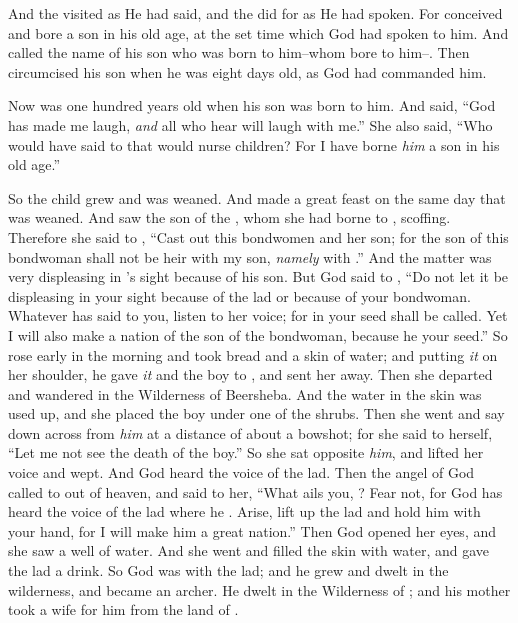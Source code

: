 
\bverse And the \lord visited \Sarah as He had said, and the \lord did for \Sarah as He had spoken.
\bverse For \Sarah conceived and bore \Abraham a son in his old age, at the set time which God had spoken to him.
\bverse And \Abraham called the name of his son who was born to him--whom \Sarah bore to him--\Isaac. 
\bverse Then \Abraham circumcised his son \Isaac when he was eight days old, as God had commanded him.

\bverse Now \Abraham was one hundred years old when his son \Isaac was born to him.
\bverse And \Sarah said, ``God has made me laugh, \textit{and} all who hear will laugh with me.''
\bverse She also said, ``Who would have said to \Abraham that \Sarah would nurse children? For I have borne \textit{him} a son in his old age.''


\bverse So the child grew and was weaned. And \Abraham made a great feast on the same day that \Isaac was weaned.
\bverse And \Sarah saw the son of  the , whom she had borne to \Abraham, scoffing.
\bverse Therefore she said to \Abraham, ``Cast out this bondwomen and her son; for the son of this bondwoman shall not be heir with my son, \textit{namely} with \Isaac.''
\bverse And the matter was very displeasing in \Abraham's sight because of his son.
\bverse But God said to \Abraham, ``Do not let it be displeasing in your sight because of the lad or because of your bondwoman. Whatever \Sarah has said to you, listen to her voice; for in \Isaac your seed shall be called.
\bverse Yet I will also make a nation of the son of the bondwoman, because he \is your seed.''
\bverse So \Abraham rose early in the morning and took bread and a skin of water; and putting \textit{it} on her shoulder, he gave \textit{it} and the boy to , and sent her away. Then she departed and wandered in the Wilderness of Beersheba.
\bverse And the water in the skin was used up, and she placed the boy under one  of the shrubs.
\bverse Then she went and say down across from \textit{him} at a distance of about a bowshot; for she said to herself, ``Let me not see the death of the boy.'' So she sat opposite \textit{him}, and lifted her voice and wept.
\bverse And God heard the voice of the lad. Then the angel of God called to  out of heaven, and said to her, ``What ails you, ? Fear not, for God has heard the voice of the lad where he \is. 
\bverse Arise, lift up the lad and hold him with your hand, for I will make him a great nation.''
\bverse Then God opened her eyes, and she saw a well of water. And she went and filled the skin with water, and gave the lad a drink.
\bverse So God was with the lad; and he grew and dwelt in the wilderness, and became an archer.
\bverse He dwelt in the Wilderness of ; and his mother took a wife for him from the land of \Egypt. 

